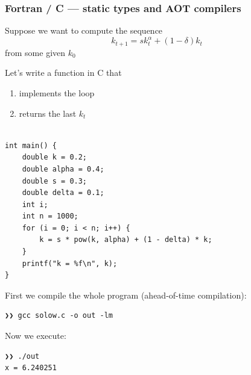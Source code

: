 \begin{frame}
    \frametitle{Fortran / C  --- static types and AOT compilers}


    \Eg Suppose we want to compute the sequence
    \begin{equation*}
        k_{t+1} = s k_t^\alpha + (1 - \delta) k_t
    \end{equation*}
    from some given $k_0$ 

        \vspace{0.5em}
        \vspace{0.5em}
        \vspace{0.5em}

    Let's write a function in C that 
    \begin{enumerate}
        \item implements the loop 
        \vspace{0.5em}
        \item returns the last $k_t$
    \end{enumerate}


\end{frame}


\begin{frame}[fragile]
    
    \begin{verbatim}

int main() {
    double k = 0.2;
    double alpha = 0.4;
    double s = 0.3;
    double delta = 0.1;
    int i;
    int n = 1000;
    for (i = 0; i < n; i++) {
        k = s * pow(k, alpha) + (1 - delta) * k;
    }
    printf("k = %f\n", k);
}
    \end{verbatim}

\end{frame}



\begin{frame}[fragile]


    First we compile the whole program (ahead-of-time compilation):
    
    \vspace{0.5em}
    \begin{verbatim}
❯❯ gcc solow.c -o out -lm
    \end{verbatim}



    \vspace{0.5em}
    \vspace{0.5em}
    \vspace{0.5em}
    Now we execute:

    \vspace{0.5em}
    \begin{verbatim}
❯❯ ./out 
x = 6.240251
    \end{verbatim}

\end{frame}


